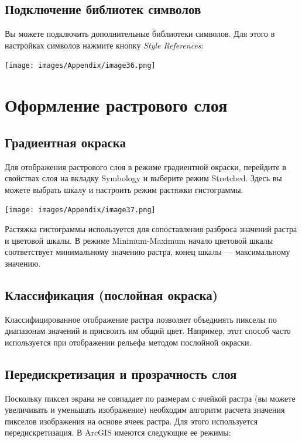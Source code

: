 \documentclass[12pt,]{book}
\begin{document}
\hypertarget{manual-vector-libraries}{%
\section{Подключение библиотек символов}\label{manual-vector-libraries}}

Вы можете подключить дополнительные библиотеки символов. Для этого в настройках символов нажмите кнопку \emph{Style References}:

\texttt{[image: images/Appendix/image36.png]}

\hypertarget{manual-raster}{%
\chapter{Оформление растрового слоя}\label{manual-raster}}

\hypertarget{section-21}{%
\section{Градиентная окраска}\label{section-21}}

Для отображения растрового слоя в режиме градиентной окраски, перейдите в свойствах слоя на вкладку Symbology и выберите режим Stretched. Здесь вы можете выбрать шкалу и настроить режим растяжки гистограммы.

\texttt{[image: images/Appendix/image37.png]}

Растяжка гистограммы используется для сопоставления разброса значений растра и цветовой шкалы. В режиме Minimum-Maximum начало цветовой шкалы соответствует минимальному значению растра, конец шкалы --- максимальному значению.

\hypertarget{section-22}{%
\section{Классификация (послойная окраска)}\label{section-22}}

Классифицированное отображение растра позволяет объединять пикселы по диапазонам значений и присвоить им общий цвет. Например, этот способ часто используется при отображении рельефа методом послойной окраски.

\hypertarget{section-23}{%
\section{Передискретизация и прозрачность слоя}\label{section-23}}

Поскольку пиксел экрана не совпадает по размерам с ячейкой растра (вы можете увеличивать и уменьшать изображение) необходим алгоритм расчета значения пикселов изображения на основе ячеек растра. Для этого используется передискретизация. В ArcGIS имеются следующие ее режимы:
\end{document}
